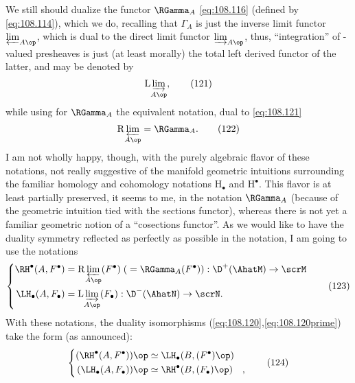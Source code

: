 We still should dualize the functor $\RGamma_A$ \eqref{eq:108.116}
(defined by \eqref{eq:108.114}), which we do, recalling that
$\Gamma_A$ is just the inverse limit functor $\varprojlim_{A\op}$,
which is dual to the direct limit functor $\varinjlim_{A\op}$, thus,
``integration'' of \scrN-valued presheaves is just (at least morally)
the total left derived functor of the latter, and may be denoted by
\begin{equation}
  \label{eq:108.121}
  \mathrm L{\varinjlim_{A\op}},\tag{121}
\end{equation}
while using for $\RGamma_A$ the equivalent notation, dual to
\eqref{eq:108.121}
\begin{equation}
  \label{eq:108.122}
  \mathrm R{\varprojlim_{A\op}} = \RGamma_A.\tag{122}
\end{equation}
I am not wholly happy, though, with the purely algebraic flavor of
these notations, not really suggestive of the manifold geometric
intuitions surrounding the familiar homology and
cohomology notations $\mathrm H_\bullet$ and $\mathrm H^\bullet$. This
flavor is at least partially preserved, it seems to me, in the
notation $\RGamma_A$ (because of the geometric intuition tied with the
sections functor), whereas there is not yet a familiar geometric
notion of a ``cosections functor''. As we would like to have the
duality symmetry reflected as perfectly as possible in the notation, I
am going to use the notations
\begin{equation}
  \label{eq:108.123}
  \left\{
    \begin{aligned}
      \RH^\bullet(A,F^\bullet) &= \mathrm
      R{\varprojlim_{A\op}}(F^\bullet)
      \;(\;=\RGamma_A(F^\bullet))
      : \D^+(\AhatM)\to\scrM \\
      \LH_\bullet(A,F_\bullet) &= \mathrm
      L{\varinjlim_{A\op}}(F_\bullet) : \D^-(\AhatN)\to\scrN.
    \end{aligned}
  \right.\tag{123}
\end{equation}
With these notations, the duality isomorphisms
(\ref{eq:108.120},\ref{eq:108.120prime}) take the form (as announced):
\begin{equation}
  \label{eq:108.124}
  \left\{
    \begin{aligned}
      (\RH^\bullet(A,F^\bullet))\op &\simeq
      \LH_\bullet(B,(F^\bullet)\op) \\
      (\LH_\bullet(A,F_\bullet))\op &\simeq
      \RH^\bullet(B,(F_\bullet)\op)\quad,
    \end{aligned}
  \right.\tag{124}
\end{equation}
